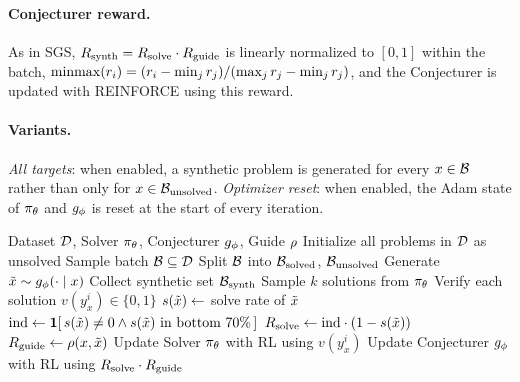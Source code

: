 \paragraph{Conjecturer reward.}
As in SGS, $R_{\text{synth}} = R_{\text{solve}} \cdot R_{\text{guide}}$ is linearly normalized to
$[0,1]$ within the batch,
$\operatorname{minmax}(r_i) = (r_i - \min_j r_j) / (\max_j r_j - \min_j r_j)$, and the
Conjecturer is updated with REINFORCE using this reward.

\paragraph{Variants.}
\emph{All targets}: when enabled, a synthetic problem is generated for every
$x \in \mathcal{B}$ rather than only for $x \in \mathcal{B}_{\mathrm{unsolved}}$.
\emph{Optimizer reset}: when enabled, the Adam state of $\pi_\theta$ and $g_\phi$
is reset at the start of every iteration.

\begin{algorithm}[tb]
  \caption{SGS~\citep{bailey2026scaling}}
  \label{alg:sgs}
  \begin{algorithmic}[1]
     Dataset $\mathcal{D}$, Solver $\pi_\theta$, Conjecturer $g_\phi$, Guide $\rho$
    \STATE Initialize all problems in $\mathcal{D}$ as unsolved
      \STATE Sample batch $\mathcal{B} \subseteq \mathcal{D}$
      \STATE Split $\mathcal{B}$ into $\mathcal{B}_{\mathrm{solved}}$, $\mathcal{B}_{\mathrm{unsolved}}$
        \STATE Generate $\tilde{x} \sim g_\phi(\cdot \mid x)$
      \ENDFOR
      \STATE Collect synthetic set $\mathcal{B}_{\mathrm{synth}}$
        \STATE Sample $k$ solutions from $\pi_\theta$
        \STATE Verify each solution $v(y_x^i) \in \{0,1\}$
      \ENDFOR
        \STATE $s(\tilde{x}) \leftarrow$ solve rate of $\tilde{x}$
        \STATE $\text{ind} \leftarrow \mathbf{1}[\, s(\tilde{x}) \neq 0 \land s(\tilde{x}) \text{ in bottom } 70\% \,]$
        \STATE $R_{\text{solve}} \leftarrow \text{ind} \cdot (1 - s(\tilde{x}))$
        \STATE $R_{\text{guide}} \leftarrow \rho(x, \tilde{x})$
      \ENDFOR
      \STATE Update Solver $\pi_\theta$ with RL using $v(y_x^i)$
      \STATE Update Conjecturer $g_\phi$ with RL using $R_{\text{solve}} \cdot R_{\text{guide}}$
    \ENDFOR
  \end{algorithmic}
\end{algorithm}

